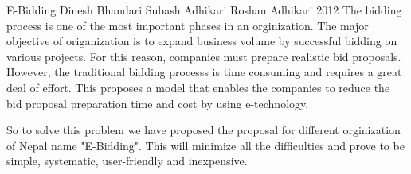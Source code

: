  \begin{conf-abstract}[]
{E-Bidding}
{
 Dinesh Bhandari
 Subash Adhikari
 Roshan Adhikari
}
{2012}
The bidding process is one of the most important phases in an orginization. The major objective of origanization is to expand business volume by successful bidding on various projects. For this reason, companies must prepare realistic bid proposals. However, the traditional bidding processs is time consuming and requires a great deal of effort. This proposes a model that enables the companies to reduce the bid proposal preparation time and cost by using e-technology.

So to solve this problem we have proposed the proposal for different orginization of Nepal name "E-Bidding". This will minimize all the difficulties and prove to be simple, systematic, user-friendly and inexpensive. 
  \end{conf-abstract}
